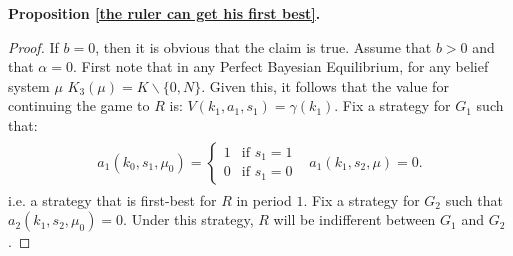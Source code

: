 \documentclass[11pt,]{article}
\begin{document}
\noindent\textbf{Proposition \ref{the ruler can get his first best}.}
\begin{proof}If $b=0$, then it is obvious that the claim is true.  Assume that $b>0$ and that $\alpha=0$.  First note that in any Perfect Bayesian Equilibrium, for any belief system $\mu$ $K_3(\mu)=K\backslash\{0,N\}$.  Given this, it follows that the value for continuing the game to $R$ is: $V(k_1,a_1,s_1)=\gamma(k_1)$.  Fix a strategy for $G_1$ such that:
\begin{align*}
\begin{array}{cc}
a_1(k_0,s_1,\mu_0)=\left\{\begin{array}{ll}
1&\mbox{if }s_1=1\\%
0&\mbox{if }s_1=0%
\end{array}\right.&a_1(k_1,s_2,\mu)=0.
\end{array}
\end{align*}%
i.e. a strategy that is first-best for $R$ in period $1$.  Fix a strategy for $G_2$ such that $a_2(k_1,s_2,\mu_0)=0$.  Under this strategy, $R$ will be indifferent between $G_1$ and $G_2$.  


\end{proof}
\end{document}
